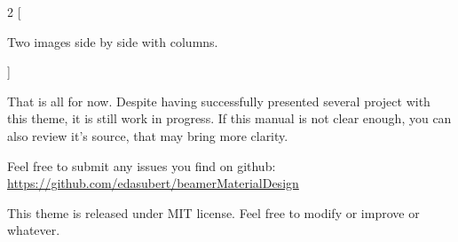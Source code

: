 \documentclass[aspectratio=43]{beamer}
\begin{document}

\begin{frame}
\begin{multicols}{2}
[
\begin{cardTiny}
Two images side by side with columns.
\end{cardTiny}
]
\centering
{}

\end{multicols}
\end{frame}


\begin{frame}
\begin{card}
That is all for now. Despite having successfully presented several project with this theme, it is still work in progress. If this manual is not clear enough, you can also review it's source, that may bring more clarity.
\end{card}
\begin{card}
Feel free to submit any issues you find on github: \\
{\footnotesize \url{https://github.com/edasubert/beamerMaterialDesign}}
\end{card}
\begin{card}
This theme is released under MIT license. Feel free to modify or improve or whatever. 
\end{card}
\end{frame}
\end{document}
